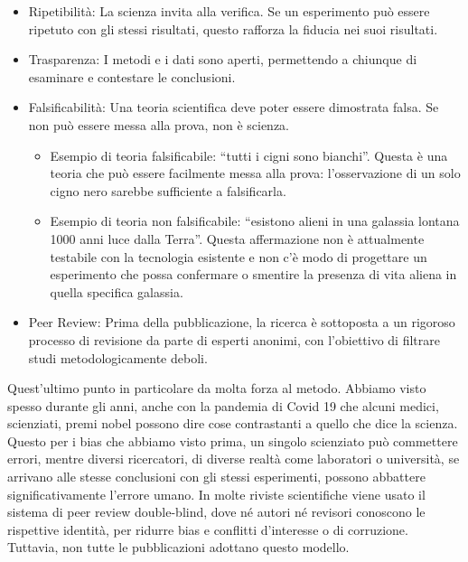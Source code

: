 \documentclass[12pt]{book} %
\begin{document}
\begin{itemize}
\item Ripetibilità: La scienza invita alla verifica. Se un esperimento può essere ripetuto con gli stessi risultati,
questo rafforza la fiducia nei suoi risultati.
\item Trasparenza: I metodi e i dati sono aperti, permettendo a chiunque di esaminare e contestare le conclusioni.
\item Falsificabilità: Una teoria scientifica deve poter essere dimostrata falsa. Se non può essere messa alla prova,
non è scienza. 

\begin{itemize}
\item Esempio di teoria falsificabile: “tutti i cigni sono bianchi”. Questa è una teoria che può essere facilmente messa
alla prova: l'osservazione di un solo cigno nero sarebbe sufficiente a falsificarla.
\item Esempio di teoria non falsificabile: “esistono alieni in una galassia lontana 1000 anni luce dalla Terra”. Questa
affermazione non è attualmente testabile con la tecnologia esistente e non c'è modo di progettare
un esperimento che possa confermare o smentire la presenza di vita aliena in quella specifica galassia.
\end{itemize}
\item Peer Review: Prima della pubblicazione, la ricerca è sottoposta a un rigoroso processo di revisione da parte di
esperti anonimi, con l’obiettivo di filtrare studi metodologicamente deboli.
\end{itemize}
Quest'ultimo punto in particolare da molta forza al metodo. Abbiamo visto spesso durante gli anni,
anche con la pandemia di Covid 19 che alcuni medici, scienziati, premi nobel possono dire cose contrastanti a quello
che dice la scienza. Questo per i bias che abbiamo visto prima, un singolo scienziato può commettere errori, mentre
diversi ricercatori, di diverse realtà come laboratori o università, se arrivano alle stesse conclusioni con gli
stessi esperimenti, possono abbattere significativamente l'errore umano. In molte riviste scientifiche viene usato il sistema di peer review double-blind, dove né autori né revisori conoscono le rispettive identità, per ridurre bias e conflitti d’interesse o di corruzione. Tuttavia, non tutte le pubblicazioni adottano questo modello.
\end{document}
